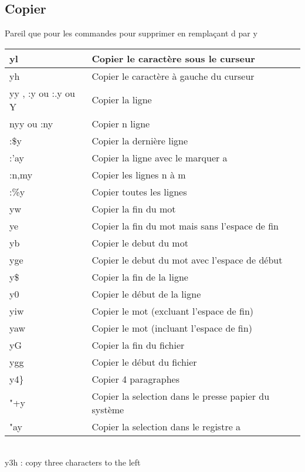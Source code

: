 \documentclass{article}
\begin{document}
\subsection{Copier}
Pareil que pour les commandes pour supprimer en remplaçant d par y\\


\begin{tabular}{|p{3cm}| l| }\hline
yl & Copier le caractère sous le curseur \\ \hline
yh & Copier le caractère à gauche du curseur \\ \hline
yy , :y ou :.y ou Y & Copier la ligne \\ \hline
nyy ou :ny & Copier n ligne \\ \hline
:\$y & Copier la dernière ligne \\ \hline
:'ay & Copier la ligne avec le marquer a \\ \hline
:n,my & Copier les lignes n à m \\ \hline
:\%y & Copier toutes les lignes \\ \hline
yw & Copier la fin du mot \\ \hline
ye & Copier la fin du mot mais sans l'espace de fin\\ \hline
yb & Copier le debut du mot\\ \hline
yge & Copier le debut du mot avec l'espace de début\\ \hline
y\$ & Copier la fin de la ligne \\ \hline
y0 & Copier le début de la ligne \\ \hline
yiw & Copier le mot (excluant l'espace de fin)\\ \hline
yaw & Copier le mot (incluant l'espace de fin)\\ \hline
yG & Copier la fin du fichier\\ \hline
ygg & Copier le début du fichier\\ \hline
y4\} & Copier 4 paragraphes\\ \hline
"+y & Copier la selection dans le presse papier du système\\ \hline
"ay & Copier la selection dans le registre a\\ \hline
\end{tabular}\\
y3h : copy three characters to the left
\end{document}
